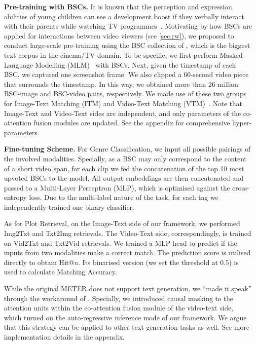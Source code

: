 \noindent\textbf{Pre-training with BSCs.} It is known that the perception and expression abilities of young children can see a development boost if they verbally interact with their parents while watching TV programmes~\citep{bullet-screen-pyschology}. Motivating by how BSCs are applied for interactions between video viewers (see \cref{sec:rw}), we proposed to conduct large-scale pre-training using the BSC collection of \TVD, which is the biggest text corpus in the cinema/TV domain.
To be specific, we first perform Masked Language Modelling (MLM)~\citep{bert2018arxiv} with BSCs. Next, given the timestamp of each BSC, we captured one screenshot frame. We also clipped a 60-second video piece that surrounds the timestamp. In this way, we obtained more than 26 million BSC-image and BSC-video pairs, respectively. We made use of these two groups for Image-Text Matching (ITM) and Video-Text Matching (VTM)~\citep{itm2019nips}. Note that Image-Text and Video-Text sides are independent, and only parameters of the co-attention fusion modules are updated. 
See the appendix for comprehensive hyper-parameters.

\noindent\textbf{Fine-tuning Scheme.} For Genre Classification, we input all possible pairings of the involved modalities. Specially, as a BSC may only correspond to the content of a short video span, for each clip we fed the concatenation of the top 10 most upvoted BSCs to the model.
All output embeddings are then concatenated and passed to a Multi-Layer Perceptron (MLP), which is optimised against the cross-entropy loss. Due to the multi-label nature of the task, for each tag we independently trained one binary classifier. 


As for Plot Retrieval, on the Image-Text side of our framework, we performed Img2Txt and Txt2Img retrievals. The Video-Text side, correspondingly, is trained on Vid2Txt and Txt2Vid retrievals.
We trained a MLP head to predict if the inputs from two modalities make a correct match.
The prediction score is utilised directly to obtain Hit@$n$. Its binarised version (we set the threshold at 0.5) is used to calculate Matching Accuracy. 


While the original METER does not support text generation, we ``made it speak'' through the workaround of \citep{captioning2020eccv}. Specially, we introduced causal masking to the attention units within the co-attention fusion module of the video-text side, which turned on the auto-regressive inference mode of our framework. We argue that this strategy can be applied to other text generation tasks as well. 
See more implementation details in the appendix.



